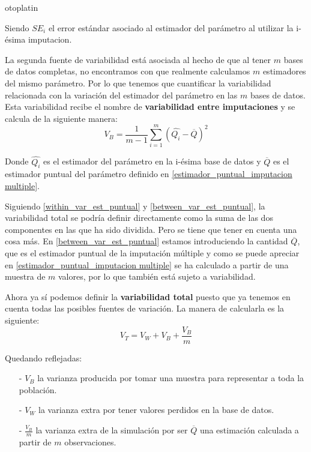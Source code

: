 otoplatin\documentclass[a4paper,openright,12pt]{report}
\begin{document}
Siendo $SE_{i}$ el error estándar asociado al estimador del parámetro al utilizar la i-ésima imputacion.

La segunda fuente de variabilidad está asociada al hecho de que al tener $m$ bases de datos completas, no encontramos con que realmente calculamos $m$ estimadores del mismo parámetro. Por lo que tenemos que cuantificar la variabilidad relacionada con la variación del estimador del parámetro en las $m$ bases de datos. Esta variabilidad recibe el nombre de \textbf{variabilidad entre imputaciones} y se calcula de la siguiente manera:
\begin{equation}
V_{B}=\frac{1}{m-1}\sum_{i=1}^{m}(\widehat{Q_{i}}-\overline{Q})^{2}
\label{between_var_est_puntual}
\end{equation}

Donde $\widehat{Q_{i}}$ es el estimador del parámetro en la i-ésima base de datos y $\overline{Q}$ es el estimador puntual del parámetro definido en \ref{estimador_puntual_imputacion multiple}.

Siguiendo \ref{within_var_est_puntual} y \ref{between_var_est_puntual}, la variabilidad total se podría definir directamente como la suma de las dos componentes en las que ha sido dividida. Pero se tiene que tener en cuenta una cosa más. En \ref{between_var_est_puntual} estamos introduciendo la cantidad $\overline{Q}$, que es el estimador puntual de la imputación múltiple y como se puede apreciar en \ref{estimador_puntual_imputacion multiple} se ha calculado a partir de una muestra de $m$ valores, por lo que también está sujeto a variabilidad.

Ahora ya sí podemos definir la \textbf{variabilidad total} puesto que ya tenemos en cuenta todas las posibles fuentes de variación. La manera de calcularla es la siguiente:
\begin{equation}
V_{T} = V_{W} + V_{B} + \frac{V_{B}}{m}
\label{total_var_est_puntual}
\end{equation}

Quedando reflejadas:
\begin{itemize}
\item[-] $V_{B}$ la varianza producida por tomar una muestra para representar a toda la población.
\item[-] $V_{W}$ la varianza extra por tener valores perdidos en la base de datos.
\item[-] $\frac{V_{B}}{m}$ la varianza extra de la simulación por ser $\overline{Q}$ una estimación calculada a partir de $m$ observaciones.
\end{itemize}
\end{document}
